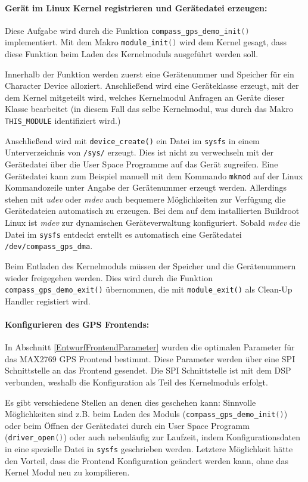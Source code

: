 \paragraph{Gerät im Linux Kernel registrieren und Gerätedatei erzeugen:} Diese Aufgabe wird durch die Funktion \lstinline[language=C]$compass_gps_demo_init()$ implementiert. Mit dem Makro \lstinline[language=C]$module_init()$ wird dem Kernel gesagt, dass diese Funktion beim Laden des Kernelmoduls ausgeführt werden soll. 

Innerhalb der Funktion werden zuerst eine Gerätenummer und Speicher für ein Character Device alloziert. Anschließend wird eine Geräteklasse erzeugt, mit der dem Kernel mitgeteilt wird, welches Kernelmodul Anfragen an Geräte dieser Klasse bearbeitet (in diesem Fall das selbe Kernelmodul, was durch das Makro \lstinline[language=C]$THIS_MODULE$ identifiziert wird.)

Anschließend wird mit \lstinline$device_create()$ ein Datei im \lstinline$sysfs$ in einem Unterverzeichnis von \lstinline$/sys/$ erzeugt. Dies ist nicht zu verwechseln mit der Gerätedatei über die User Space Programme auf das Gerät zugreifen. Eine Gerätedatei kann zum Beispiel manuell mit dem Kommando \lstinline$mknod$ auf der Linux Kommandozeile unter Angabe der Gerätenummer erzeugt werden. Allerdings stehen mit \emph{udev} oder \emph{mdev} auch bequemere Möglichkeiten zur Verfügung die Gerätedateien automatisch zu erzeugen. Bei dem auf dem \comboard installierten Buildroot Linux ist \emph{mdev} zur dynamischen Geräteverwaltung konfiguriert. Sobald \emph{mdev} die Datei im \lstinline$sysfs$ entdeckt erstellt es automatisch eine Gerätedatei \lstinline$/dev/compass_gps_dma$.

Beim Entladen des Kernelmoduls müssen der Speicher und die Gerätenummern wieder freigegeben werden. Dies wird durch die Funktion \lstinline$compass_gps_demo_exit()$ übernommen, die mit \lstinline$module_exit()$ als Clean-Up Handler registiert wird.

\paragraph{Konfigurieren des GPS Frontends:}
In Abschnitt \ref{EntwurfFrontendParameter} wurden die optimalen Parameter für das MAX2769 GPS Frontend bestimmt. Diese Parameter werden über eine SPI Schnittstelle an das Frontend gesendet. Die SPI Schnittstelle ist mit dem DSP verbunden, weshalb die Konfiguration als Teil des Kernelmoduls erfolgt.

Es gibt verschiedene Stellen an denen dies geschehen kann: Sinnvolle Möglichkeiten sind z.B. beim Laden des Moduls (\lstinline[language=C]$compass_gps_demo_init()$) oder beim Öffnen der Gerätedatei durch ein User Space Programm (\lstinline[language=C]$driver_open()$) oder auch nebenläufig zur Laufzeit, indem Konfigurationsdaten in eine spezielle Datei in \lstinline$sysfs$ geschrieben werden. Letztere Möglichkeit hätte den Vorteil, dass die Frontend Konfiguration geändert werden kann, ohne das Kernel Modul neu zu kompilieren.

